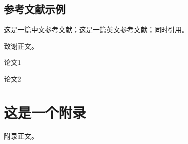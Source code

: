 \documentclass[format=draft,degree=bachelor]{hustthesis}
\begin{document}
\section{参考文献示例}
这是一篇中文参考文献\cite{TEXGURU99}；这是一篇英文参考文献\cite{knuth}；同时引用\cite{TEXGURU99,knuth}。

\backmatter

\begin{ack}
致谢正文。
\end{ack}



\appendix

\begin{publications}
    \item 论文1
    \item 论文2
\end{publications}

\chapter{这是一个附录}
附录正文。
\end{document}
